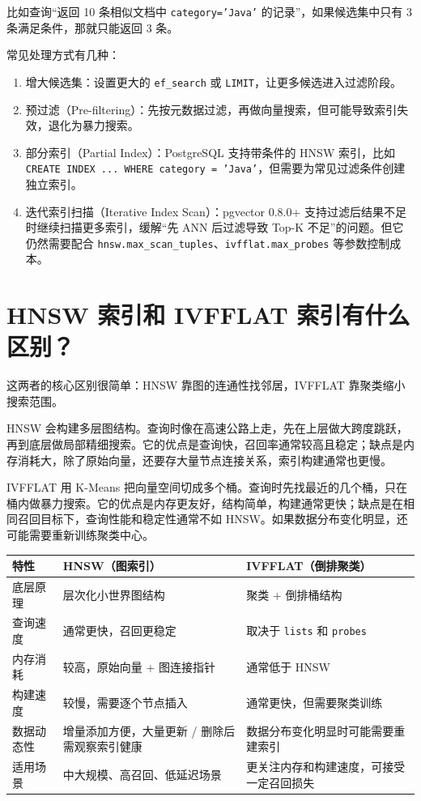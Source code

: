 \documentclass[10pt,a4paper]{ctexart}
\begin{document}
比如查询“返回 10 条相似文档中 \texttt{category='Java'} 的记录”，如果候选集中只有 3 条满足条件，那就只能返回 3 条。



常见处理方式有几种：


\begin{enumerate}[itemsep=2pt, topsep=4pt]
  \item 增大候选集：设置更大的 \texttt{ef\_search} 或 \texttt{LIMIT}，让更多候选进入过滤阶段。
  \item 预过滤（Pre-filtering）：先按元数据过滤，再做向量搜索，但可能导致索引失效，退化为暴力搜索。
  \item 部分索引（Partial Index）：PostgreSQL 支持带条件的 HNSW 索引，比如 \texttt{CREATE INDEX ... WHERE category = 'Java'}，但需要为常见过滤条件创建独立索引。
  \item 迭代索引扫描（Iterative Index Scan）：pgvector 0.8.0+ 支持过滤后结果不足时继续扫描更多索引，缓解“先 ANN 后过滤导致 Top-K 不足”的问题。但它仍然需要配合 \texttt{hnsw.max\_scan\_tuples}、\texttt{ivfflat.max\_probes} 等参数控制成本。
\end{enumerate}


\section{HNSW 索引和 IVFFLAT 索引有什么区别？}


这两者的核心区别很简单：HNSW 靠图的连通性找邻居，IVFFLAT 靠聚类缩小搜索范围。



HNSW 会构建多层图结构。查询时像在高速公路上走，先在上层做大跨度跳跃，再到底层做局部精细搜索。它的优点是查询快，召回率通常较高且稳定；缺点是内存消耗大，除了原始向量，还要存大量节点连接关系，索引构建通常也更慢。



IVFFLAT 用 K-Means 把向量空间切成多个桶。查询时先找最近的几个桶，只在桶内做暴力搜索。它的优点是内存更友好，结构简单，构建通常更快；缺点是在相同召回目标下，查询性能和稳定性通常不如 HNSW。如果数据分布变化明显，还可能需要重新训练聚类中心。


{\footnotesize
\begin{tabularx}{\textwidth}{|X|X|X|}
\hline
\textbf{特性} & \textbf{HNSW（图索引）} & \textbf{IVFFLAT（倒排聚类）} \\
\hline
底层原理 & 层次化小世界图结构 & 聚类 + 倒排桶结构 \\
\hline
查询速度 & 通常更快，召回更稳定 & 取决于 \texttt{lists} 和 \texttt{probes} \\
\hline
内存消耗 & 较高，原始向量 + 图连接指针 & 通常低于 HNSW \\
\hline
构建速度 & 较慢，需要逐个节点插入 & 通常更快，但需要聚类训练 \\
\hline
数据动态性 & 增量添加方便，大量更新 / 删除后需观察索引健康 & 数据分布变化明显时可能需要重建索引 \\
\hline
适用场景 & 中大规模、高召回、低延迟场景 & 更关注内存和构建速度，可接受一定召回损失 \\
\hline
\end{tabularx}
}
\end{document}
